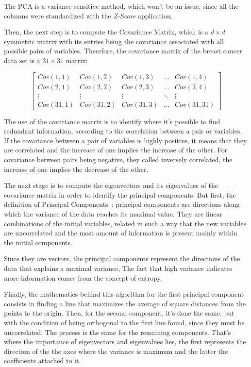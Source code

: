 \documentclass[conference]{IEEEtran}
\begin{document}
The PCA is a variance sensitive method, which won't be an issue, since all the columns were standardized with the \textit{Z-Score} application. 

Then, the next step is to compute the Covariance Matrix, which is a $d \times d$ symmetric matrix with its entries being the covariance associated with all possible pairs of variables. Therefore, the covariance matrix of the breast cancer data set is a $31 \times 31$ matrix: 

\[
\begin{bmatrix}
    Cov(1,1) & Cov(1,2) & Cov(1,3) & \dots  & Cov(1,4) \\
    Cov(2,1) & Cov(2,2) & Cov(2,3) & \dots  & Cov(2,4) \\
    \vdots & \vdots & \vdots & \ddots & \vdots \\
    Cov(31,1) & Cov(31,2) & Cov(31,3) & \dots  & Cov(31,31)
\end{bmatrix}
\]

The use of the covariance matrix is to identify where it's possible to find redundant information, according to the correlation between a pair or variables. If the 
covariance between a pair of variables is highly positive, it means that they are correlated and the increase of one implies the increase of the other. For covariance between pairs being negative, they called inversely correlated, the increase of one implies the decrease of the other.

The next stage is to compute the eigenvectors and its eigenvalues of the covariance matrix in order to identify the principal components. But first, the definition of Principal Components~\cite{Ringner2001}: principal components are directions along which the variance of the data reaches its maximal value. They are linear combinations of the initial variables, related in such a way that the new variables are uncorrelated and the most amount of information is present mainly within the initial components.

Since they are vectors, the principal components represent the directions of the data that explains a maximal variance, The fact that high variance indicates more 
information comes from the concept of entropy. 

Finally, the mathematics behind this algorithm for the first principal component consists in finding a line that maximizes the average of square distances from the 
points to the origin. Then, for the second component, it's done the same, but with the condition of being orthogonal to the first line found, since they must be uncorrelated. The process is the same for the remaining components. That's where the importance of eigenvectors and eigenvalues lies, the first represents the direction of the the axes where the variance is maximum and the latter the coefficients attached to it. 
\end{document}
